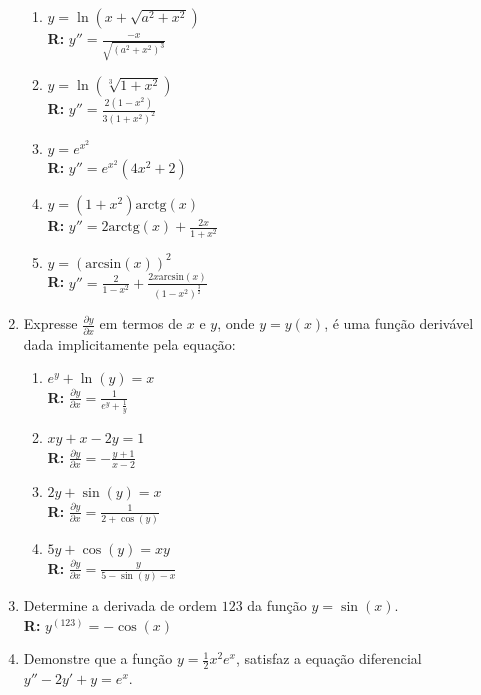 \documentclass[oneside,a4paper,12pt]{article}
\begin{document}
\begin{enumerate}
        \begin{enumerate}
         \item $y = \ln(x + \sqrt{a^2 + x^2})$ \\\textbf{R: } $y'' = \displaystyle \frac{-x}{\sqrt{(a^2+x^2)^3}}$
         \item $y = \ln(\sqrt[3]{1+x^2})$ \\\textbf{R: } $y'' = \displaystyle \frac{2(1-x^2)}{3(1+x^2)^2}$
         \item $y = e^{x^2}$ \\\textbf{R: } $y'' = e^{x^2}(4x^2+2)$
         \item $y = (1+x^2)\text{arctg}(x)$ \\\textbf{R: } $y'' = 2\text{arctg}(x)+\displaystyle\frac{2x}{1+x^2}$
         \item $y = (\text{arcsin}(x))^2$ \\\textbf{R: } $y'' = \displaystyle \frac{2}{1-x^2} + \displaystyle \frac{2x \text{arcsin}(x)}{(1-x^2)^{\frac{3}{2}}}$
        \end{enumerate}
    \item Expresse $\displaystyle \frac{\partial y}{\partial x}$ em termos de $x$ e $y$, onde $y=y(x)$, é uma função derivável dada implicitamente pela equação:
        \begin{enumerate}
         \item $e^y + \ln(y) = x$ \\\textbf{R: } $\displaystyle \frac{\partial y}{\partial x} = \displaystyle \frac{1}{e^y + \displaystyle \frac{1}{y}}$
         \item $xy+x-2y=1$ \\\textbf{R: } $\displaystyle \frac{\partial y}{\partial x} = - \displaystyle \frac{y+1}{x-2} $
         \item $2y + \sin(y) = x$ \\\textbf{R: } $\displaystyle \frac{\partial y}{\partial x} = \displaystyle \frac{1}{2 + \cos(y)} $
         \item $5y + \cos(y) = xy$ \\\textbf{R: } $\displaystyle \frac{\partial y}{\partial x} = \frac{y}{5 - \sin(y) -x} $
        \end{enumerate}
    \item Determine a derivada de ordem $123$ da função $y = \sin(x)$. \\\textbf{R: } $y^{(123)}=-\cos(x)$
    
    \item Demonstre que a função $y = \displaystyle \frac{1}{2}x^2e^x$, satisfaz a equação diferencial $y'' - 2y' + y = e^x$.
    

\end{enumerate}
\end{document}
